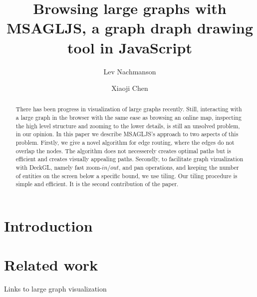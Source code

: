 \documentclass{gd-llncs}
\begin{document}
\title{Browsing large graphs with MSAGLJS, a graph draph drawing tool in JavaScript }
\author{%
  Lev Nachmanson  \and
  Xiaoji Chen
}%
\maketitle


\begin{abstract}
  There has been progress in visualization of large graphs recently. Still, interacting with a large graph in the browser with the same ease as browsing an online map, inspecting the high level structure and zooming to the lower details, is still an unsolved problem, in our opinion. In this paper we describe MSAGLJS's approach to two aspects of this problem. Firstly, we give a novel algorithm for edge routing, where the edges do not overlap the nodes. The algorithm does not necesserely creates optimal paths but is efficient and creates visually appealing paths. Secondly, to facilitate graph vizualization with DeckGL, namely fast zoom-\(in/out\), and pan operations, and keeping the number of entities on the screen below a specific bound, we use tiling. Our tiling procedure is simple and efficient. It is the second contribution of the paper.
\end{abstract}






\section*{Introduction}

\label{sec:intro}
\section*{Related work}
Links to large graph visualization


\cite{graphexp}

\cite{graphviz}

\cite{regraph}

\cite{skewed}

\cite{circos}
\end{document}

